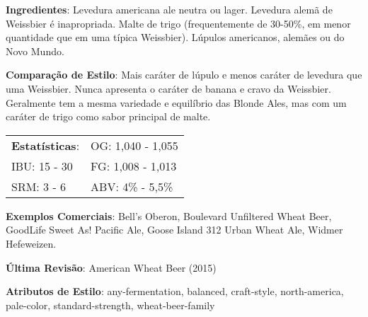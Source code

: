 \textbf{Ingredientes}: Levedura americana ale neutra ou lager. Levedura alemã de Weissbier é inapropriada. Malte de trigo (frequentemente de 30-50\%, em menor quantidade que em uma típica Weissbier). Lúpulos americanos, alemães ou do Novo Mundo.

\textbf{Comparação de Estilo}: Mais caráter de lúpulo e menos caráter de levedura que uma Weissbier. Nunca apresenta o caráter de banana e cravo da Weissbier. Geralmente tem a mesma variedade e equilíbrio das Blonde Ales, mas com um caráter de trigo como sabor principal de malte.

\begin{tabular}{@{}p{35mm}p{35mm}@{}}
  \textbf{Estatísticas}: & OG: 1,040 - 1,055 \\
  IBU: 15 - 30  & FG: 1,008 - 1,013 \\
  SRM: 3 - 6  & ABV: 4\% - 5,5\%
\end{tabular}

\textbf{Exemplos Comerciais}: Bell’s Oberon, Boulevard Unfiltered Wheat Beer, GoodLife Sweet As! Pacific Ale, Goose Island 312 Urban Wheat Ale, Widmer Hefeweizen.

\textbf{Última Revisão}: American Wheat Beer (2015)

\textbf{Atributos de Estilo}: any-fermentation, balanced, craft-style, north-america, pale-color, standard-strength, wheat-beer-family
